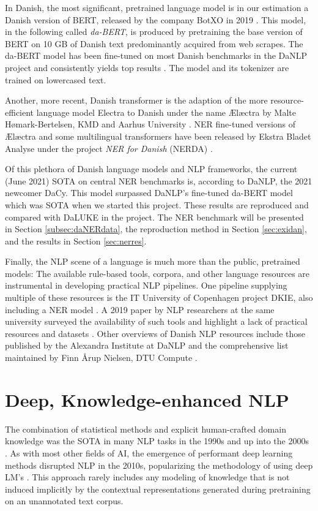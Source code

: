 \documentclass[main.tex]{subfiles}
\begin{document}
In Danish, the most significant, pretrained language model is in our estimation a Danish version of BERT, released by the company BotXO in 2019 \cite{botxo2019dabert}.
This model, in the following called \emph{da-BERT}, is produced by pretraining the base version of BERT \cite{devlin2019bert} on 10 GB of Danish text predominantly acquired from web scrapes.
The da-BERT model has been fine-tuned on most Danish benchmarks in the DaNLP project and consistently yields top results \cite{danlp2021, hvingelby2020dane}.
The model and its tokenizer are trained on lowercased text.

Another, more recent, Danish transformer is the adaption of the more resource-efficient language model Electra to Danish under the name Ælæctra by Malte Hømark-Bertelsen, KMD and Aarhus University \cite{bertelsen2020lctra}.
NER fine-tuned versions of Ælæctra and some multilingual transformers have been released by Ekstra Bladet Analyse under the project \emph{NER for Danish} (NERDA) \cite{kjeldgaard2020nerda}.

Of this plethora of Danish language models and NLP frameworks, the current (June 2021) SOTA on central NER benchmarks is, according to DaNLP, the 2021 newcomer DaCy.
This model surpassed DaNLP's fine-tuned da-BERT model which was SOTA when we started this project\footnotemark.
These results are reproduced and compared with DaLUKE in the project.
The NER benchmark will be presented in Section \ref{subsec:daNERdata}, the reproduction method in Section \ref{sec:exidan}, and the results in Section \ref{sec:nerres}.

Finally, the NLP scene of a language is much more than the public, pretrained models:
The available rule-based tools, corpora, and other language resources are instrumental in developing practical NLP pipelines.
One pipeline supplying multiple of these resources is the IT University of Copenhagen project DKIE, also including a NER model \cite{derc2014dkie}.
A 2019 paper by NLP researchers at the same university surveyed the availability of such tools and highlight a lack of practical resources and datasets \cite{kirkedal2019lacunae}.
Other overviews of Danish NLP resources include those published by the Alexandra Institute at DaNLP \cite{danlp2021} and the comprehensive list maintained by Finn Årup Nielsen, DTU Compute \cite{arup21awesome}.

\section{Deep, Knowledge-enhanced NLP}
The combination of statistical methods and explicit human-crafted domain knowledge was the SOTA in many NLP tasks in the 1990s and up into the 2000s \cite[Sec. 22.5]{russell2016ai}.
As with most other fields of AI, the emergence of performant deep learning methods disrupted NLP in the 2010s, popularizing the methodology of using deep LM's \cite{otter18dlnlp}.
This approach rarely includes any modeling of knowledge that is not induced implicitly by the contextual representations generated during pretraining on an unannotated text corpus.
\end{document}
